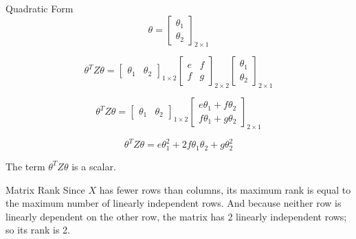 \documentclass{beamer}
\begin{document}
\begin{frame}{Quadratic Form}
\begin{equation*}
        \theta = \begin{bmatrix}
        \theta_{1}\\
        \theta_{2}
        \end{bmatrix}_{2\times 1}
    \end{equation*}
    
    \pause
    \begin{equation*}
    \theta^{T}Z\theta=  \begin{bmatrix}
    \theta_1&\theta_2
    \end{bmatrix}_{1\times 2} \begin{bmatrix}
    e&f\\
    f&g
    \end{bmatrix}_{2\times 2}\begin{bmatrix}
    \theta_{1}\\
    \theta_{2}
    \end{bmatrix}_{2\times 1}
    \end{equation*}
    
    \pause
    \begin{equation*}
    \theta^{T}Z\theta=  \begin{bmatrix}
    \theta_1&\theta_2
    \end{bmatrix}_{1\times 2} \begin{bmatrix}
    e\theta_1+f\theta_2\\
    f\theta_1+g\theta_2
    \end{bmatrix}_{2\times 1}
    \end{equation*}

    \pause
    \begin{equation*}
        \theta^{T}Z\theta = e\theta_{1}^{2} + 2f\theta_{1}\theta_{2}+g\theta_{2}^{2} 
    \end{equation*}

The term $\theta^{T}Z\theta$ is a scalar.
\end{frame}

\begin{frame}{Matrix Rank}
Since $X$ has fewer rows than columns, its maximum rank is equal to the maximum number of linearly independent rows. And because neither row is linearly dependent on the other row, the matrix has 2 linearly independent rows; so its rank is 2.
\end{frame}
\end{document}
